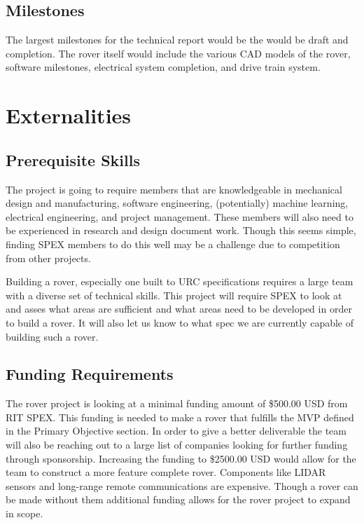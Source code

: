 \documentclass[conference]{IEEEtran} %
\begin{document}
\subsection{Milestones}
\label{subsec:milestones}
The largest milestones for the technical report would be the would be draft and completion. 
The rover itself would include the various CAD models of the rover, software milestones, electrical system completion, and drive train system. 

\section{Externalities}
\subsection{Prerequisite Skills}
The project is going to require members that are knowledgeable in mechanical design and manufacturing, software engineering, (potentially) machine learning, electrical engineering, and project management. These members will also need to be experienced in research and design document work. Though this seems simple, finding SPEX members to do this well may be a challenge due to competition from other projects. 

Building a rover, especially one built to URC specifications requires a large team with a diverse set of technical skills. 
This project will require SPEX to look at and asses what areas are sufficient and what areas need to be developed in order to build a rover. 
It will also let us know to what spec we are currently capable of building such a rover. 

\subsection{Funding Requirements}

The rover project is looking at a minimal funding amount of \$500.00 USD from RIT SPEX. This funding is needed to make a rover that fulfills the MVP defined in the Primary Objective section. In order to give a better deliverable the team will also be reaching out to a large list of companies looking for further funding through sponsorship. Increasing the funding to \$2500.00 USD would allow for the team to construct a more feature complete rover. Components like LIDAR sensors and long-range remote communications are expensive. Though a rover can be made without them additional funding allows for the rover project to expand in scope. 
\end{document}
